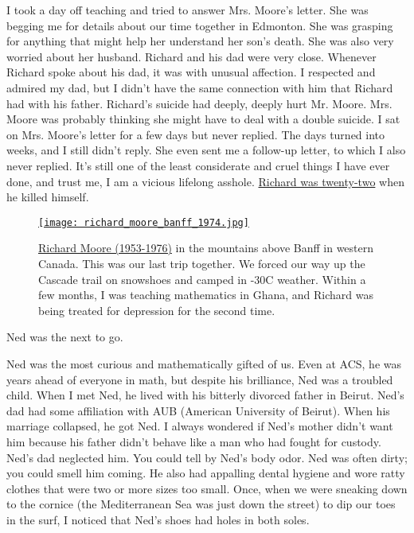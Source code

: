 I took a day off teaching and tried to answer Mrs. Moore's letter. She
was begging me for details about our time together in Edmonton. She was
grasping for anything that might help her understand her son's death.
She was also very worried about her husband. Richard and his dad were
very close. Whenever Richard spoke about his dad, it was with unusual
affection. I respected and admired my dad, but I didn't have the same
connection with him that Richard had with his father. Richard's suicide
had deeply, deeply hurt Mr. Moore. Mrs. Moore was probably thinking she
might have to deal with a double suicide. I sat on Mrs. Moore's letter
for a few days but never replied. The days turned into weeks, and I
still didn't reply. She even sent me a follow-up letter, to which I also
never replied. It's still one of the least considerate and cruel things
I have ever done, and trust me, I am a vicious lifelong asshole.
\href{https://www.findagrave.com/memorial/162651768/richard_william-moore}{Richard
was twenty-two} when he killed himself.

\captionsetup[figure]{labelformat=empty}
\begin{SCfigure}
\centering
\href{https://conceptcontrol.smugmug.com/People/Inlaws-Outlaws-and-Friends/i-dNPP9pn/A}{\texttt{[image: richard\_moore\_banff\_1974.jpg]}}
\caption[Richard Moore (1953-1976)]{\href{https://www.findagrave.com/memorial/162651768/richard_william-moore}{Richard
Moore (1953-1976)} in the mountains above Banff in western Canada. This
was our last trip together. We forced our way up the Cascade trail on
snowshoes and camped in -30C weather. Within a few months, I was
teaching mathematics in Ghana, and Richard was being treated for
depression for the second time.}
\label{fig:8196x1}
\end{SCfigure}

Ned was the next to go.

Ned was the most curious and mathematically gifted of us. Even at ACS,
he was years ahead of everyone in math, but despite his brilliance, Ned
was a troubled child. When I met Ned, he lived with his bitterly
divorced father in Beirut. Ned's dad had some affiliation with AUB
(American University of Beirut). When his marriage collapsed, he got
Ned. I always wondered if Ned's mother didn't want him because his
father didn't behave like a man who had fought for custody. Ned's dad
neglected him. You could tell by Ned's body odor. Ned was often dirty;
you could smell him coming. He also had appalling dental hygiene and
wore ratty clothes that were two or more sizes too small. Once, when we
were sneaking down to the cornice (the Mediterranean Sea was just down
the street) to dip our toes in the surf, I noticed that Ned's shoes had
holes in both soles.


